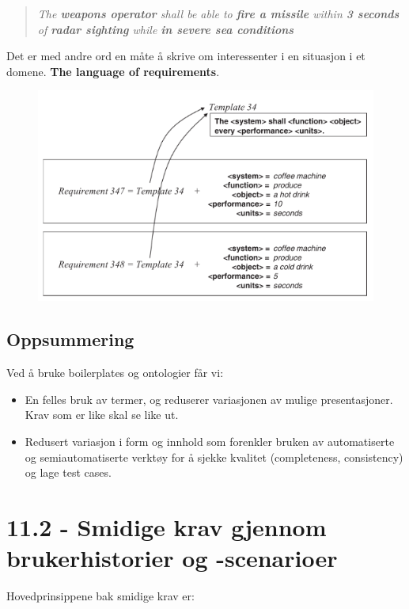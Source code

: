 \begin{quote}
\emph{The \textbf{weapons operator} shall be able to \textbf{fire a
missile} within \textbf{3 seconds} of \textbf{radar sighting} while
\textbf{in severe sea conditions}}

\end{quote}
Det er med andre ord en måte å skrive om interessenter i en situasjon i
et domene. \textbf{The language of requirements}.

\begin{figure}[htbp]
\centering
\includegraphics{Forelesning 02/img/boilerplate.png}
\caption{}
\end{figure}

\subsection{Oppsummering}

Ved å bruke boilerplates og ontologier får vi:

\begin{itemize}
\item
  En felles bruk av termer, og reduserer variasjonen av mulige
  presentasjoner. Krav som er like skal se like ut.
\item
  Redusert variasjon i form og innhold som forenkler bruken av
  automatiserte og semiautomatiserte verktøy for å sjekke kvalitet
  (completeness, consistency) og lage test cases.
\end{itemize}
\section{11.2 - Smidige krav gjennom brukerhistorier og -scenarioer}

Hovedprinsippene bak smidige krav er:

